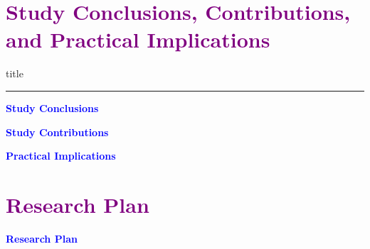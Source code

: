 \documentclass[aspectratio=169]{beamer}
\begin{document}
\section{\textbf{\textcolor{purple}{Study Conclusions, Contributions, and Practical Implications
}}}
    \begin{frame}[plain]
        \vfill
      \centering
      \begin{beamercolorbox}[sep=8pt,center,shadow=true,rounded=true]{title}
        \insertsectionhead\par%
        \color{oxfordblue}\noindent\rule{10cm}{1pt}
      \end{beamercolorbox}
      \vfill
  \end{frame}


\begin{frame}{\textcolor{blue}{\textbf{Study Conclusions}}}
    
\end{frame}


\begin{frame}{\textcolor{blue}{\textbf{Study Contributions}}}
    
\end{frame}


\begin{frame}{\textcolor{blue}{\textbf{Practical Implications}}}
    
\end{frame}

\section{\textbf{\textcolor{purple}{Research Plan}}}

\begin{frame}{\textcolor{blue}{\textbf{Research Plan}}}
    \vspace{-0.8cm}

\end{frame}
\end{document}
